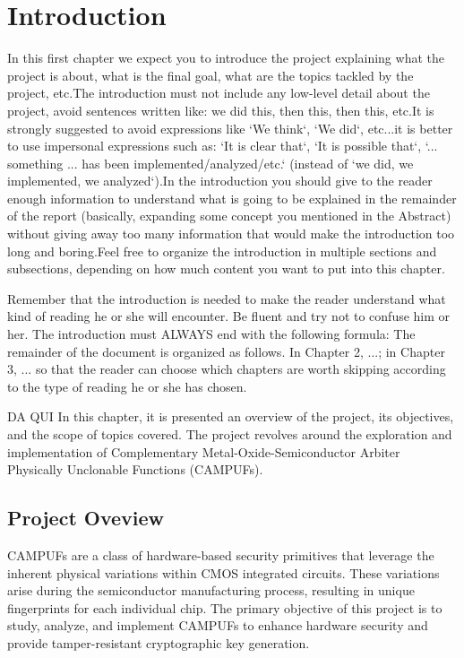 \chapter{Introduction}
In this first chapter we expect you to introduce the project explaining what the project is about, what is the final goal, what are the topics tackled by the project, etc.\newline The introduction must not include any low-level detail about the project, avoid sentences written like: we did this, then this, then this, etc.\newline It is strongly suggested to avoid expressions like `We think`, `We did`, etc...it is better to use impersonal expressions such as: `It is clear that`, `It is possible that`, `... something ... has been implemented/analyzed/etc.` (instead of `we did, we implemented, we analyzed`).\newline In the introduction you should give to the reader enough information to understand what is going to be explained in the remainder of the report (basically, expanding some concept you mentioned in the Abstract) without giving away too many information that would make the introduction too long and boring.\newline Feel free to organize the introduction in multiple sections and subsections, depending on how much content you want to put into this chapter.

Remember that the introduction is needed to make the reader understand what kind of reading he or she will encounter. Be fluent and try not to confuse him or her.
The introduction must ALWAYS end with the following formula: The remainder of the document is organized as follows. In Chapter 2, ...; in Chapter 3, ... so that the reader can choose which chapters are worth skipping according to the type of reading he or she has chosen.




DA QUI
In this chapter, it is presented an overview of the project, its objectives, and the scope of topics covered. The project revolves around the exploration and implementation of Complementary Metal-Oxide-Semiconductor Arbiter Physically Unclonable Functions (CAMPUFs).
\section {Project Oveview}
CAMPUFs are a class of hardware-based security primitives that leverage the inherent physical variations within CMOS integrated circuits. These variations arise during the semiconductor manufacturing process, resulting in unique fingerprints for each individual chip. The primary objective of this project is to study, analyze, and implement CAMPUFs to enhance hardware security and provide tamper-resistant cryptographic key generation.

